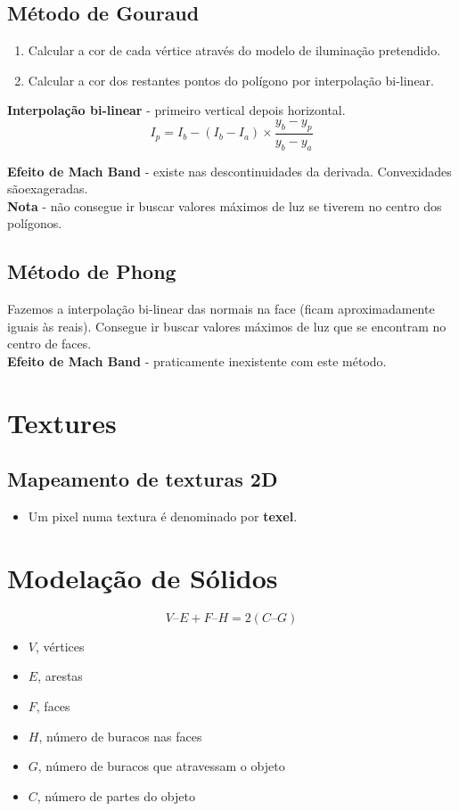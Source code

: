 \documentclass{report}
\begin{document}
\section{Método de Gouraud}
\begin{enumerate}
\item Calcular a cor de cada vértice através do modelo de iluminação pretendido.
\item Calcular a cor dos restantes pontos do polígono por interpolação bi-linear.
\end{enumerate}
\textbf{Interpolação bi-linear} - primeiro vertical depois horizontal.\\

\begin{equation}
    I_p = I_b - (I_b - I_a) \times \frac{y_b - y_p}{y_b - y_a}
\end{equation}

\textbf{Efeito de Mach Band} - existe nas descontinuidades da derivada. Convexidades sãoexageradas.\\
\textbf{Nota} - não consegue ir buscar valores máximos de luz se tiverem no centro dos polígonos.

\section{Método de Phong}
Fazemos a interpolação bi-linear das normais na face (ficam aproximadamente iguais às reais).
Consegue ir buscar valores máximos de luz que se encontram no centro de faces.\\
\textbf{Efeito de Mach Band} - praticamente inexistente com este método.

\chapter{Textures}
\section{Mapeamento de texturas 2D}
\begin{itemize}
\item Um pixel numa textura é denominado por \textbf{texel}.
\end{itemize}

\chapter{Modelação de Sólidos}

\begin{equation}
    V – E + F – H = 2 (C – G)
\end{equation}

\begin{itemize}
    \item $V$, vértices
    \item $E$, arestas
    \item $F$, faces
    \item $H$, número de buracos nas faces
    \item $G$, número de buracos que atravessam o objeto
    \item $C$, número de partes do objeto
\end{itemize}
\end{document}
